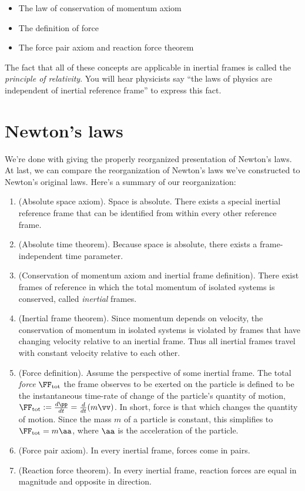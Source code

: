 \documentclass{article}
\begin{document}
\begin{itemize}
	\item The law of conservation of momentum axiom
	\item The definition of force
	\item The force pair axiom and reaction force theorem
\end{itemize}

The fact that all of these concepts are applicable in inertial frames is called the \textit{principle of relativity}. You will hear physicists say ``the laws of physics are independent of inertial reference frame'' to express this fact.

\section*{Newton's laws}

We're done with giving the properly reorganized presentation of Newton's laws. At last, we can compare the reorganization of Newton's laws we've constructed to Newton's original laws. Here's a summary of our reorganization:

\begin{enumerate}
	\item (Absolute space axiom). Space is absolute. There exists a special inertial reference frame that can be identified from within every other reference frame.
	
	\item (Absolute time theorem). Because space is absolute, there exists a frame-independent time parameter.
	
	\item (Conservation of momentum axiom and inertial frame definition). There exist frames of reference in which the total momentum of isolated systems is conserved, called \textit{inertial} frames.
	
	\item (Inertial frame theorem). Since momentum depends on velocity, the conservation of momentum in isolated systems is violated by frames that have changing velocity relative to an inertial frame. Thus all inertial frames travel with constant velocity relative to each other.
	
	\item (Force definition). Assume the perspective of some inertial frame. The total \textit{force} $\FF_{\text{tot}}$ the frame observes to be exerted on the particle is defined to be the instantaneous time-rate of change of the particle's quantity of motion, $\FF_{\text{tot}} := \frac{d\pp}{dt} = \frac{d}{dt}(m\vv)$. In short, force is that which changes the quantity of motion. Since the mass $m$ of a particle is constant, this simplifies to $\FF_{\text{tot}} = m\aa$, where $\aa$ is the acceleration of the particle.
	
	\item (Force pair axiom). In every inertial frame, forces come in pairs.
	
	\item (Reaction force theorem). In every inertial frame, reaction forces are equal in magnitude and opposite in direction.
\end{enumerate}
\end{document}
